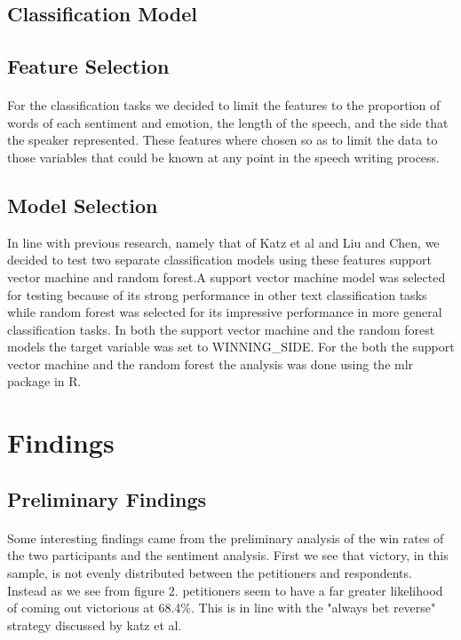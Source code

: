 \documentclass[12pt,english]{article}
\begin{document}
\subsection{Classification Model}
\subsection{Feature Selection}
\paragraph{}
For the classification tasks we decided to limit the features to the proportion of words of each sentiment and emotion, the length of the speech, and the side that the speaker represented. These features where chosen so as to limit the data to those variables that could be known at any point in the speech writing process.
\subsection{Model Selection}
In line with previous research, namely that of Katz et al and Liu and Chen, we decided to test two separate classification models using these features support vector machine\citep{liu_two-phase_2018} and random forest\citep{katz_general_2017}.A support vector machine model was selected for testing because of its strong performance in other text classification tasks while random forest was selected for its impressive performance in more general classification tasks. In both the support vector machine and the random forest models the target variable was set to WINNING\_SIDE. For the both the support vector machine and the random forest the analysis was done using the mlr package in R. 

\section{Findings}
\subsection{Preliminary Findings}
\paragraph{}
Some interesting findings came from the preliminary analysis of the win rates of the two participants and the sentiment analysis. First we see that victory, in this sample, is not evenly distributed between the petitioners and respondents. Instead as we see from figure 2. petitioners seem to have a far greater likelihood of coming out victorious at 68.4\%. This is in line with the "always bet reverse" strategy discussed by katz et al. 
\end{document}
